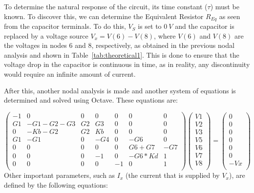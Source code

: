 To determine the natural response of the circuit, its time constant ($\tau$) must be known. To discover this, we can determine the Equivalent Resistor $R_{Eq}$ as seen from the capacitor terminals. To do this, $V_{S}$ is set to $0~V$ and the capacitor is replaced by a voltage source $V_{x} = V(6) - V(8)$, where $V(6)$ and $V(8)$ are the voltages in nodes 6 and 8, respectively, as obtained in the previous nodal analysis and shown in Table~\ref{tab:theoretical1}. This is done to ensure that the voltage drop in the capacitor is continuous in time, as in reality, any discontinuity would require an infinite amount of current. 

After this, another nodal analysis is made and another system of equations is determined and solved using Octave. These equations are:

\begin{equation}
\begin{pmatrix}
-1 & 0 & 0 & 0 & 0 & 0 & 0\\
G1 & -G1-G2-G3 & G2 & G3 & 0 & 0 & 0\\
0 & -Kb-G2 & G2 & Kb & 0 & 0 & 0\\
G1 & -G1 & 0 & -G4 & 0 & -G6 & 0\\
0 & 0 & 0 & 0 & 0 & G6+G7 & -G7\\
0 & 0 & 0 & -1 & 0 & -G6*Kd & 1\\
0 & 0 & 0 & 0 & -1 & 0 & 1\\
\end{pmatrix}
\begin{pmatrix}
V1\\
V2\\
V3\\
V5\\
V6\\
V7\\
V8\\
\end{pmatrix}
=
\begin{pmatrix}
0\\
0\\
0\\
0\\
0\\
0\\
-Vx\\
\end{pmatrix}
\end{equation}
\newpage
Other important parameters, such as $I_x$ (the current that is supplied by $V_x$), are defined by the following equations:

